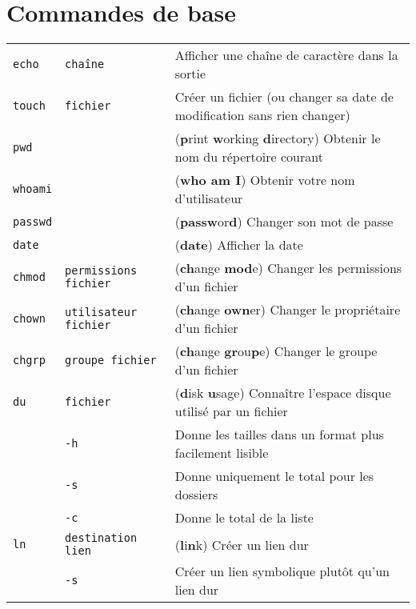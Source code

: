 \documentclass [a4paper]{article}
\begin{document}
\section*{Commandes de base}

\noindent
\begin{tabular}{ lll }
\hline
{\verb+echo+}   & \verb+chaîne+                     & Afficher une chaîne de caractère dans la sortie \\
{\verb+touch+}  & \verb+fichier+                    & Créer un fichier (ou changer sa date de modification sans rien changer) \\
{\verb+pwd+}    &                                   & (\textbf{p}rint \textbf{w}orking \textbf{d}irectory) Obtenir le nom du répertoire courant \\
{\verb+whoami+} &                                   & (\textbf{who am I}) Obtenir votre nom d'utilisateur \\ 
{\verb+passwd+} &                                   & (\textbf{passw}or\textbf{d}) Changer son mot de passe \\
{\verb+date+}   &                                   & (\textbf{date}) Afficher la date \\
{\verb+chmod+}  & \verb+permissions fichier+        & (\textbf{ch}ange \textbf{mod}e) Changer les permissions d'un fichier \\
{\verb+chown+}  & \verb+utilisateur fichier+        & (\textbf{ch}ange \textbf{own}er) Changer le propriétaire d'un fichier \\
{\verb+chgrp+}  & \verb+groupe fichier+             & (\textbf{ch}ange \textbf{gr}ou\textbf{p}e) Changer le groupe d'un fichier \\
{\verb+du+}     & \verb+fichier+                    & (\textbf{d}isk \textbf{u}sage) Connaître l'espace disque utilisé par un fichier \\
                & \hspace{-0.6cm}\verb+-h+                         & \hspace{0.4cm} Donne les tailles dans un format plus facilement lisible \\
                & \hspace{-0.6cm}\verb+-s+                         & \hspace{0.4cm} Donne uniquement le total pour les dossiers\\
                & \hspace{-0.6cm}\verb+-c+                         & \hspace{0.4cm} Donne le total de la liste\\
{\verb+ln+}     & \verb+destination lien+           & (\textbf{l}i\textbf{n}k) Créer un lien dur \\
                & \hspace{-0.6cm}\verb+-s+                         & \hspace{0.4cm} Créer un lien symbolique plutôt qu'un lien dur \\
\hline
\end{tabular}
\end{document}
